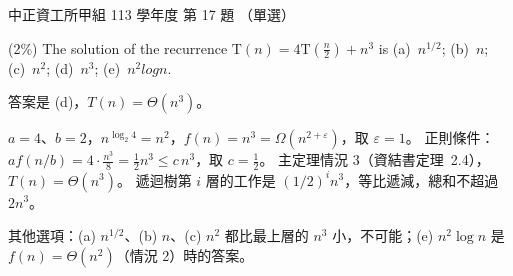 \begin{pastexam}[label={px:ccu-113-swa-12}]{中正資工所甲組 113 學年度 第 17 題}
（單選）

(2\%) The solution of the recurrence $\mathrm{T}(n)=4\mathrm{T}\left(\frac{n}{2}\right)+n^3$ is \quad (a)~$n^{1/2}$; (b)~$n$; (c)~$n^2$; (d)~$n^3$; (e)~$n^2logn$.
\end{pastexam}

\begin{pastsoln}
答案是 (d)，$T(n) = \Theta(n^3)$。

$a = 4$、$b = 2$，$n^{\log_2 4} = n^2$，$f(n) = n^3 = \Omega(n^{2 + \varepsilon})$，取 $\varepsilon = 1$。 正則條件：
$a f(n/b) = 4 \cdot \frac{n^3}{8} = \frac{1}{2} n^3 \le c\, n^3$，取 $c = \frac{1}{2}$。 主定理情況 3（資結書定理~2.4），
$T(n) = \Theta(n^3)$。 遞迴樹第 $i$ 層的工作是 $(1/2)^i n^3$，等比遞減，總和不超過 $2n^3$。

其他選項：(a) $n^{1/2}$、(b) $n$、(c) $n^2$ 都比最上層的 $n^3$ 小，不可能；(e) $n^2 \log n$ 是 $f(n) = \Theta(n^2)$（情況 2）時的答案。
\end{pastsoln}
